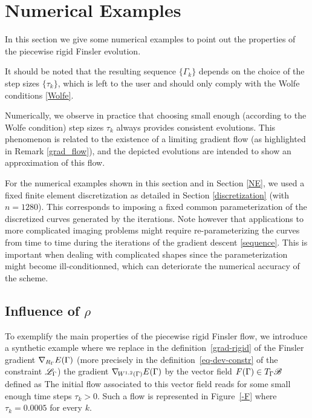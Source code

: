 \section{Numerical Examples}\label{examples}

In this section we give some numerical examples to point out the properties of the piecewise rigid Finsler evolution. 

It should be noted that the resulting sequence $\{\Gamma_k\}$ depends on the choice of the step sizes $\{\tau_k\}$, which is left to the user and should only comply with the Wolfe conditions \eqref{Wolfe}.

Numerically, we observe in practice  that choosing small enough (according to the Wolfe condition) step sizes $\tau_k$ always provides consistent evolutions. This phenomenon is related to the existence of a limiting gradient flow (as highlighted in Remark \ref{grad_flow}), and the depicted evolutions are intended to show an approximation of this flow.



For the numerical examples shown in this section and in Section \ref{NE}, we used a fixed finite element discretization as detailed in Section \ref{discretization} (with $n=1280$). 
	This corresponds to 
 	imposing a fixed common parameterization of the discretized curves generated by the iterations. Note however that applications
	to more complicated imaging problems might require re-parameterizing the curves from time to time during the iterations
	of the gradient descent \eqref{sequence}. This is important when dealing with complicated shapes since the parameterization 
	might become ill-conditionned, 
	which can deteriorate the numerical accuracy of the scheme. 

\subsection{Influence of $\rho$} 
\label{sec-influ-rho}

To exemplify the main properties of the piecewise rigid Finsler flow, we introduce a synthetic example where we replace in the definition~\eqref{grad-rigid} of the Finsler gradient $\nabla_{R_\Gamma} E(\Gamma)$ (more precisely in the definition~\eqref{eq-dev-constr} of the constraint $\mathcal{L}_\Gamma$) the  gradient $\nabla_{\!W^{1,2}(\Gamma)} E(\Gamma)$ by the vector field $F(\Gamma) \in T_\Gamma \mathcal{B}$ defined as
The initial flow associated to this vector field reads
for some small enough time steps $\tau_k>0$. Such a flow is represented in Figure~\ref{-F} where $\tau_k = 0.0005$ for every $k$.

